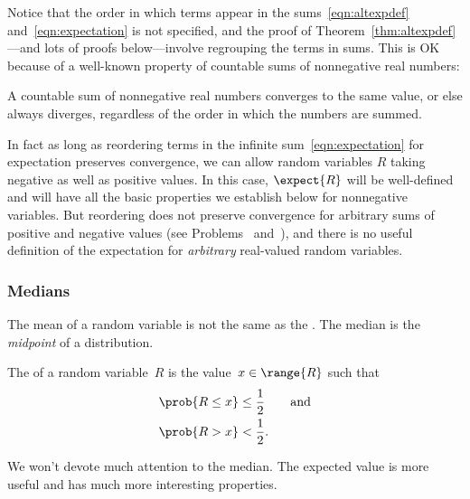 Notice that the order in which terms appear in the
sums~\eqref{eqn:altexpdef} and~\eqref{eqn:expectation} is not
specified, and the proof of Theorem~\ref{thm:altexpdef}---and lots of
proofs below---involve regrouping the terms in sums.  This is OK
because of a well-known property of countable sums of nonnegative real
numbers:
\begin{theorem}
A countable sum of nonnegative real numbers converges to the same
value, or else always diverges, regardless of the order in which the
numbers are summed.
\end{theorem}
\begin{editingnotes}
\end{editingnotes}
In fact as long as reordering terms in the infinite
sum~\eqref{eqn:expectation} for expectation preserves convergence, we
can allow random variables $R$ taking negative as well as positive
values.  In this case, $\expect{R}$ will be well-defined and will have
all the basic properties we establish below for nonnegative variables.
But reordering does not preserve convergence for arbitrary sums of
positive and negative values (see
Problems~
and~), and there is no useful
definition of the expectation for \emph{arbitrary} real-valued random
variables.

\begin{editingnotes}
\subsubsection{Medians}
The mean of a random variable is not the same as the .
The median is the \emph{midpoint} of a distribution.
 
\begin{definition}%
The  of a random variable~$R$ is the value~$x \in
\range{R}$ such that
\begin{align*}
    \prob{R \le x} & \le \frac{1}{2} \qquad \text{and} \\
    \prob{R > x}   & <    \frac{1}{2}.
\end{align*}
\end{definition}

We won't devote much attention to the median.  The expected value is
more useful and has much more interesting properties.
\end{editingnotes}

\iffalse
\footnote{Some texts define the median to be the
  value of $x \in \range{R}$ for which $\prob{R \le x} < 1/2$ and
  $\prob{R > x} \le 1/2$.  The difference in definitions is
  not important.}
\fi


